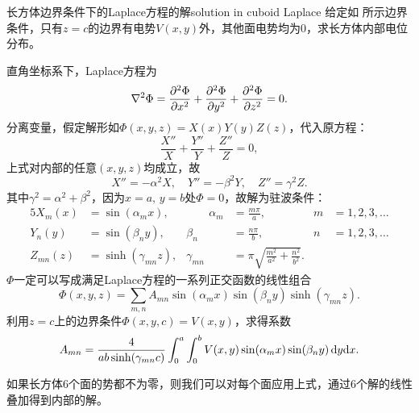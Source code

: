 \begin{example}{长方体边界条件下的Laplace方程的解}{solution in cuboid Laplace}
    给定如 所示边界条件，只有$z=c$的边界有电势$V(x,y)$外，其他面电势均为0，求长方体内部电位分布。
    \begin{center}
        \label{fig:cuboid boundary}
    \end{center}
    直角坐标系下，Laplace方程为
    \[
        \lapla\Phi=\pv[2]\Phi x+\pv[2]\Phi y+\pv[2]\Phi z=0.
    \]
    分离变量，假定解形如$\Phi(x,y,z)=X(x)Y(y)Z(z)$，代入原方程：
    \[
        \frac{X''}X+\frac{Y''}Y+\frac{Z''}Z=0,
    \]
    上式对内部的任意$(x,y,z)$均成立，故
    \[
        X''=-\alpha^2X,\quad Y''=-\beta^2Y,\quad Z''=\gamma^2Z.
    \]
    其中$\gamma^2=\alpha^2+\beta^2$，因为$x=a,\,y=b$处$\Phi=0$，故解为驻波条件：
    \begin{alignat*}{5}
        X_m(x)&=\sin(\alpha_mx),&\qquad\alpha_m&=\frac{m\pi}a,&m&=1,2,3,\ldots\\
        Y_n(y)&=\sin(\beta_ny),&\beta_n&=\frac{n\pi}b,&n&=1,2,3,\ldots\\
        Z_{mn}(z)&=\sinh(\gamma_{mn}z),&\gamma_{mn}&=\pi\sqrt{\frac{m^2}{a^2}+\frac{n^2}{b^2}}.
    \end{alignat*}
    $\Phi$一定可以写成满足Laplace方程的一系列正交函数的线性组合
    \[
        \Phi(x,y,z)=\sum_{m,n}A_{mn}\sin(\alpha_mx)\sin(\beta_ny)\sinh(\gamma_{mn}z).
    \]
    利用$z=c$上的边界条件$\Phi(x,y,c)=V(x,y)$，求得系数
    \[
        A_{mn}=\frac4{ab\sinh(\gamma_{mn}c)}\int_0^a\int_0^bV(x,y)\sin(\alpha_mx)\sin(\beta_ny)\d y\nd x.
    \]
\end{example}
\begin{remark}
    如果长方体6个面的势都不为零，则我们可以对每个面应用上式，通过6个解的线性叠加得到内部的解。
\end{remark}

